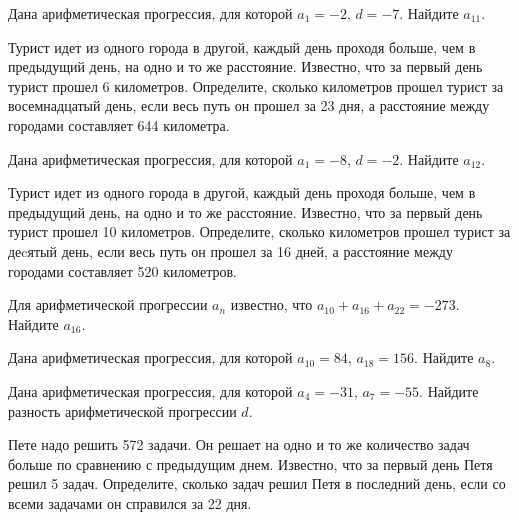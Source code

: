 \documentclass[4apaper]{article}
\begin{document}
\begin{taskBN}{86}
Дана арифметическая прогрессия, для которой $a_1 = -2$, $d=-7$. Найдите $a_{11}$.
\end{taskBN}

\begin{taskBN}{87}
Турист идет из одного города в другой, каждый день проходя больше, чем в предыдущий день, на одно и то же расстояние. Известно, что за первый день турист прошел 6 километров. Определите, сколько километров прошел турист за восемнадцатый день, если весь путь он прошел за 23 дня, а расстояние между городами составляет 644 километра.
\end{taskBN}

\begin{taskBN}{88}
Дана арифметическая прогрессия, для которой $a_1 = -8$, $d=-2$. Найдите $a_{12}$.
\end{taskBN}

\begin{taskBN}{89}
Турист идет из одного города в другой, каждый день проходя больше, чем в предыдущий день, на одно и то же расстояние. Известно, что за первый день турист прошел 10 километров. Определите, сколько километров прошел турист за деcятый день, если весь путь он прошел за 16 дней, а расстояние между городами составляет 520 километров.
\end{taskBN}

\begin{taskBN}{90}
Для арифметической прогрессии ${a_n}$ известно, что $a_{10} + a_{16} + a_{22}= -273$. Найдите $a_{16}$.
\end{taskBN}

\begin{taskBN}{91}
Дана арифметическая прогрессия, для которой $a_{10} = 84$, $a_{18} = 156$. Найдите $a_{8}$.
\end{taskBN}

\begin{taskBN}{92}
Дана арифметическая прогрессия, для которой $a_{4} = -31$, $a_{7} = -55$. Найдите разность арифметической прогрессии $d$.
\end{taskBN}

\begin{taskBN}{93}
Пете надо решить 572 задачи. Он решает на одно и то же количество задач больше по сравнению с предыдущим днем. Известно, что за первый день Петя решил 5 задач. Определите, сколько задач решил Петя в последний день, если со всеми задачами он справился за 22 дня.
\end{taskBN}
\end{document}
